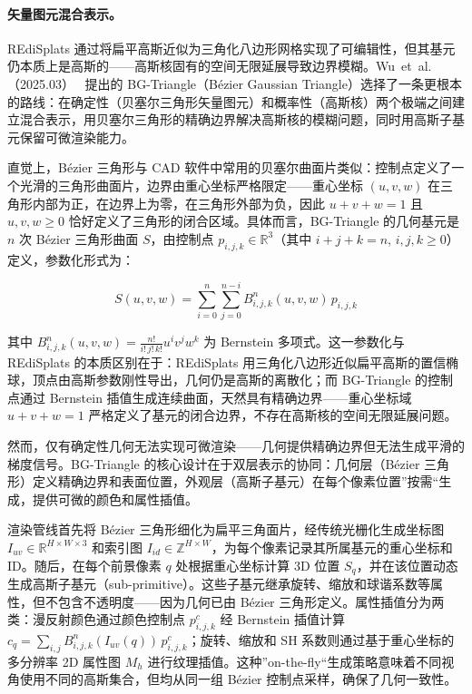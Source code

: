 \paragraph{矢量图元混合表示。}

REdiSplats 通过将扁平高斯近似为三角化八边形网格实现了可编辑性，但其基元仍本质上是高斯的——高斯核固有的空间无限延展导致边界模糊。Wu~et~al.（2025.03）~\cite{2503_13961} 提出的 BG-Triangle（B\'{e}zier Gaussian Triangle）选择了一条更根本的路线：在确定性（贝塞尔三角形矢量图元）和概率性（高斯核）两个极端之间建立混合表示，用贝塞尔三角形的精确边界解决高斯核的模糊问题，同时用高斯子基元保留可微渲染能力。

直觉上，B\'{e}zier 三角形与 CAD 软件中常用的贝塞尔曲面片类似：控制点定义了一个光滑的三角形曲面片，边界由重心坐标严格限定——重心坐标 $(u,v,w)$ 在三角形内部为正，在边界上为零，在三角形外部为负，因此 $u+v+w=1$ 且 $u,v,w \geq 0$ 恰好定义了三角形的闭合区域。具体而言，BG-Triangle 的几何基元是 $n$ 次 B\'{e}zier 三角形曲面 $S$，由控制点 $p_{i,j,k} \in \mathbb{R}^3$（其中 $i+j+k=n$, $i,j,k \geq 0$）定义，参数化形式为：

\begin{equation}
S(u,v,w) = \sum_{i=0}^{n} \sum_{j=0}^{n-i} B_{i,j,k}^{n}(u,v,w) \, p_{i,j,k}
\end{equation}

其中 $B_{i,j,k}^{n}(u,v,w) = \frac{n!}{i!\,j!\,k!} u^i v^j w^k$ 为 Bernstein 多项式。这一参数化与 REdiSplats 的本质区别在于：REdiSplats 用三角化八边形近似扁平高斯的置信椭球，顶点由高斯参数刚性导出，几何仍是高斯的离散化；而 BG-Triangle 的控制点通过 Bernstein 插值生成连续曲面，天然具有精确边界——重心坐标域 $u+v+w=1$ 严格定义了基元的闭合边界，不存在高斯核的空间无限延展问题。

然而，仅有确定性几何无法实现可微渲染——几何提供精确边界但无法生成平滑的梯度信号。BG-Triangle 的核心设计在于双层表示的协同：几何层（B\'{e}zier 三角形）定义精确边界和表面位置，外观层（高斯子基元）在每个像素位置”按需“生成，提供可微的颜色和属性插值。

渲染管线首先将 B\'{e}zier 三角形细化为扁平三角面片，经传统光栅化生成坐标图 $I_{uv} \in \mathbb{R}^{H \times W \times 3}$ 和索引图 $I_{id} \in \mathbb{Z}^{H \times W}$，为每个像素记录其所属基元的重心坐标和 ID。随后，在每个前景像素 $q$ 处根据重心坐标计算 3D 位置 $S_q$，并在该位置动态生成高斯子基元（sub-primitive）。这些子基元继承旋转、缩放和球谐系数等属性，但不包含不透明度——因为几何已由 B\'{e}zier 三角形定义。属性插值分为两类：漫反射颜色通过颜色控制点 $p_{i,j,k}^c$ 经 Bernstein 插值计算 $c_q = \sum_{i,j} B_{i,j,k}^n(I_{uv}(q)) \, p_{i,j,k}^c$；旋转、缩放和 SH 系数则通过基于重心坐标的多分辨率 2D 属性图 $M_h$ 进行纹理插值。这种”on-the-fly“生成策略意味着不同视角使用不同的高斯集合，但均从同一组 B\'{e}zier 控制点采样，确保了几何一致性。

